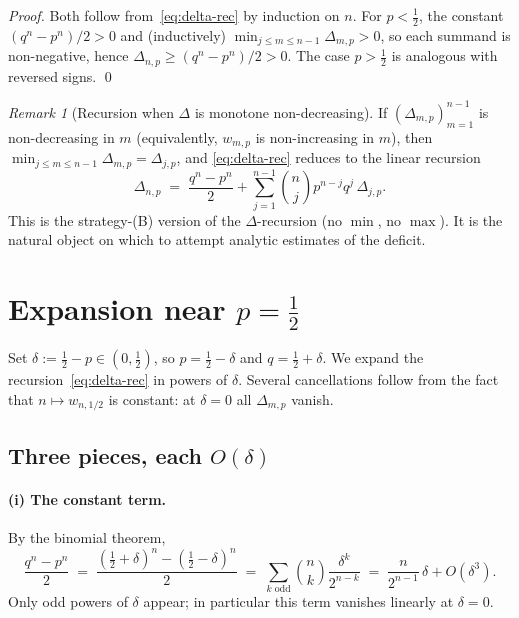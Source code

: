 \documentclass{article}
\theoremstyle{remark}
\newtheorem*{remark}{Remark}
\begin{document}
\begin{proof}
Both follow from~\eqref{eq:delta-rec} by induction on $n$. For
$p<\tfrac12$, the constant $(q^n-p^n)/2>0$ and (inductively)
$\min_{j\le m\le n-1}\Delta_{m,p}>0$, so each summand is non-negative,
hence $\Delta_{n,p}\ge(q^n-p^n)/2>0$. The case $p>\tfrac12$ is
analogous with reversed signs. \qed
\end{proof}

\begin{remark}[Recursion when $\Delta$ is monotone non-decreasing]
If $(\Delta_{m,p})_{m=1}^{n-1}$ is non-decreasing in $m$ (equivalently,
$w_{m,p}$ is non-increasing in $m$), then $\min_{j\le m\le n-1}\Delta_{m,p}=\Delta_{j,p}$,
and \eqref{eq:delta-rec} reduces to the linear recursion
\[
  \Delta_{n,p}\;=\;\frac{q^n-p^n}{2}+\sum_{j=1}^{n-1}\binom{n}{j}p^{n-j}q^{j}\,\Delta_{j,p}.
\]
This is the strategy-(B) version of the $\Delta$-recursion (no $\min$,
no $\max$). It is the natural object on which to attempt analytic
estimates of the deficit.
\end{remark}

\section*{Expansion near $p=\tfrac12$}

Set $\delta:=\tfrac12-p\in(0,\tfrac12)$, so $p=\tfrac12-\delta$ and
$q=\tfrac12+\delta$. We expand the recursion~\eqref{eq:delta-rec} in
powers of $\delta$. Several cancellations follow from the fact that
$n\mapsto w_{n,1/2}$ is constant: at $\delta=0$ all $\Delta_{m,p}$
vanish.

\subsection*{Three pieces, each $O(\delta)$}

\paragraph{(i) The constant term.} By the binomial theorem,
\begin{equation}\label{eq:const-expand}
  \frac{q^n-p^n}{2}\;=\;\frac{(\tfrac12+\delta)^n-(\tfrac12-\delta)^n}{2}
  \;=\;\sum_{k\text{ odd}}\binom{n}{k}\frac{\delta^{k}}{2^{n-k}}
  \;=\;\frac{n}{2^{n-1}}\,\delta+O(\delta^{3}).
\end{equation}
Only odd powers of $\delta$ appear; in particular this term vanishes
linearly at $\delta=0$.
\end{document}
